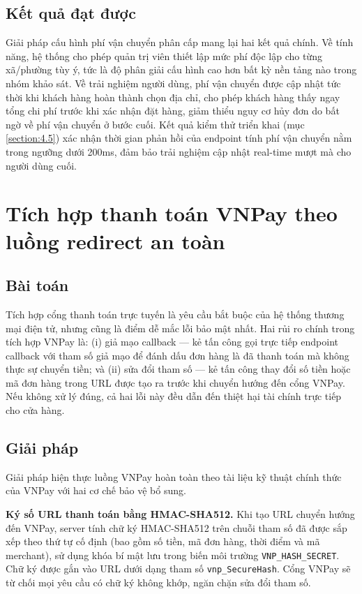\documentclass[../DoAn.tex]{subfiles}
\begin{document}
\subsection{Kết quả đạt được}
\label{subsection:5.3.3}

Giải pháp cấu hình phí vận chuyển phân cấp mang lại hai kết quả chính. Về
tính năng, hệ thống cho phép quản trị viên thiết lập mức phí độc lập cho từng
xã/phường tùy ý, tức là độ phân giải cấu hình cao hơn bất kỳ nền tảng nào
trong nhóm khảo sát. Về trải nghiệm người dùng, phí vận chuyển được cập nhật
tức thời khi khách hàng hoàn thành chọn địa chỉ, cho phép khách hàng thấy
ngay tổng chi phí trước khi xác nhận đặt hàng, giảm thiểu nguy cơ hủy đơn
do bất ngờ về phí vận chuyển ở bước cuối. Kết quả kiểm thử triển khai (mục
\ref{section:4.5}) xác nhận thời gian phản hồi của endpoint tính phí vận
chuyển nằm trong ngưỡng dưới 200ms, đảm bảo trải nghiệm cập nhật real-time
mượt mà cho người dùng cuối.

\section{Tích hợp thanh toán VNPay theo luồng redirect an toàn}
\label{section:5.4}

\subsection{Bài toán}
\label{subsection:5.4.1}

Tích hợp cổng thanh toán trực tuyến là yêu cầu bắt buộc của hệ thống thương
mại điện tử, nhưng cũng là điểm dễ mắc lỗi bảo mật nhất. Hai rủi ro chính
trong tích hợp VNPay là: (i) giả mạo callback --- kẻ tấn công gọi trực tiếp
endpoint callback với tham số giả mạo để đánh dấu đơn hàng là đã thanh toán
mà không thực sự chuyển tiền; và (ii) sửa đổi tham số --- kẻ tấn công thay
đổi số tiền hoặc mã đơn hàng trong URL được tạo ra trước khi chuyển hướng
đến cổng VNPay. Nếu không xử lý đúng, cả hai lỗi này đều dẫn đến thiệt hại
tài chính trực tiếp cho cửa hàng.

\subsection{Giải pháp}
\label{subsection:5.4.2}

Giải pháp hiện thực luồng VNPay hoàn toàn theo tài liệu kỹ thuật chính thức
của VNPay với hai cơ chế bảo vệ bổ sung.

\textbf{Ký số URL thanh toán bằng HMAC-SHA512.} Khi tạo URL chuyển hướng đến
VNPay, server tính chữ ký HMAC-SHA512 trên chuỗi tham số đã được sắp xếp
theo thứ tự cố định (bao gồm số tiền, mã đơn hàng, thời điểm và mã merchant),
sử dụng khóa bí mật lưu trong biến môi trường \texttt{VNP\_HASH\_SECRET}.
Chữ ký được gắn vào URL dưới dạng tham số \texttt{vnp\_SecureHash}. Cổng
VNPay sẽ từ chối mọi yêu cầu có chữ ký không khớp, ngăn chặn sửa đổi tham
số.
\end{document}
